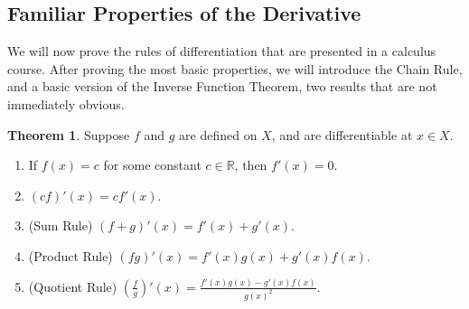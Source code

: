\documentclass{article}
\newcommand{\R}{\mathbb{R}}
\theoremstyle{definition}
\newtheorem{theorem}{Theorem}[section]
\begin{document}
\subsection{Familiar Properties of the Derivative}
We will now prove the rules of differentiation that are presented in a calculus course. After proving the most basic properties, we will introduce the Chain Rule, and a basic version of the Inverse Function Theorem, two results that are not immediately obvious.  
\begin{theorem}
Suppose $ f $ and $ g $ are defined on $  X $, and are differentiable at $ x\in  X $.
\begin{enumerate}
	\item If $ f(x)=c $ for some constant $ c\in\R $, then $ f'(x)=0 $.
	\item $ (cf)'(x)=cf'(x) $.
	\item (Sum Rule) $ (f+g)'(x)=f'(x)+g'(x)$.
	\item (Product Rule) $(fg)'(x)=f'(x)g(x)+g'(x)f(x) $.
	\item (Quotient Rule) $\left(\frac{f}{g}\right)'(x)=\frac{f'(x)g(x)-g'(x)f(x)}{g(x)^2} $.
\end{enumerate}
\end{theorem}
\end{document}
